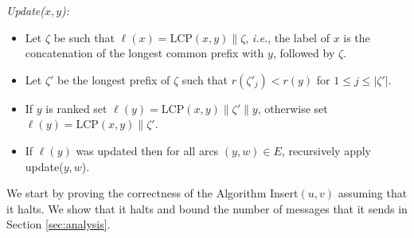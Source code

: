 \documentclass[11pt]{article}
\theoremstyle{plain}
\theoremstyle{definition}
\theoremstyle{remark}
\numberwithin{equation}{section}
\begin{document}
\emph{Update($x,y$):}
\begin{itemize}
\item Let $\zeta$ be such that  $\ell(x) = \mathrm{LCP}(x,y) \| \zeta$, {\sl i.e.}, the label of $x$ is the concatenation of the longest common prefix with $y$, followed by $\zeta$.
\item Let $\zeta'$ be the longest prefix of $\zeta$ such that $r(\zeta'_j) < r(y)$ for $1\leq j \leq |\zeta'|$.
\item \label{alg:update} If $y$ is ranked set $\ell(y) = \mathrm{LCP}(x,y) \| \zeta' \| y$, otherwise set $\ell(y) = \mathrm{LCP}(x,y) \| \zeta'$.
\item\label{update:recurse} If $\ell(y)$ was updated then for all arcs $(y,w)\in E$, recursively apply update($y,w$).
\end{itemize}


We start by proving the correctness of the  Algorithm Insert$(u,v)$
assuming that it halts. We show that it halts and  bound the number
of messages that it sends in Section \ref{sec:analysis}.
\end{document}
